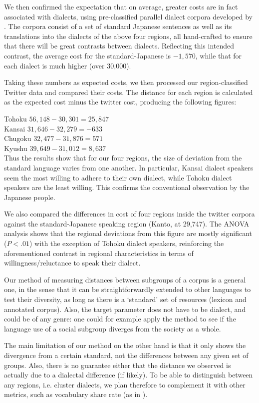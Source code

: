 \documentclass[a4,12pt]{article}
\begin{document}
We then confirmed the expectation that on average, greater costs are in fact associated with dialects, using pre-classified parallel dialect corpora developed by \cite{YoshinoEtAl16}. The corpora consist of a set of standard Japanese sentences as well as its translations into the dialects of the above four regions, all hand-crafted to ensure that there will be great contrasts between dialects. Reflecting this intended contrast, the average cost for the standard-Japanese is $-1,570$, while that for each dialect is much higher (over 30,000).

Taking these numbers as expected costs, we then processed our region-classified Twitter data and compared their costs. The distance for each region is calculated as the expected cost minus the twitter cost, producing the following figures:

\medskip

Tohoku $56,148 - 30,301  = 25,847$\\
\indent Kansai $31,646 - 32,279 = -633$\\
\indent Chugoku $32,477 - 31,876 = 571$\\
\indent Kyushu $39,649 - 31,012 = 8,637$\\

\noindent Thus the results show that for our four regions, the size of deviation from the standard language varies from one another. In particular, Kansai dialect speakers seem the most willing to adhere to their own dialect, while Tohoku dialect speakers are the least willing. This confirms the conventional observation by the Japanese people.

We also compared the differences in cost of four regions inside the twitter corpora against the standard-Japanese speaking region (Kanto, at 29,747). The ANOVA analysis shows that the regional deviations from this figure are mostly significant ($P<.01$) with the exception of Tohoku dialect speakers, reinforcing the aforementioned contrast in regional characteristics in terms of willingness/reluctance to speak their dialect.

Our method of measuring distances between subgroups of a corpus is a general one, in the sense that it can be straightforwardly extended to other languages to test their diversity, as long as there is a `standard' set of resources (lexicon and annotated corpus). Also, the target parameter does not have to be dialect, and could be of any genre: one could for example apply the method to see if the language use of a social subgroup diverges from the society as a whole.

The main limitation of our method on the other hand is that it only shows the divergence from a certain standard, not the differences between any given set of groups. Also, there is no guarantee either that the distance we observed is actually due to a dialectal difference (if likely). To be able to distinguish between any regions, i.e. cluster dialects, we plan therefore to complement it with other metrics, such as vocabulary share rate  (as in \cite{Inoue08}). 



\renewcommand{\refname}{\normalfont\selectfont\normalsize \bf{References}} 


\end{document}
